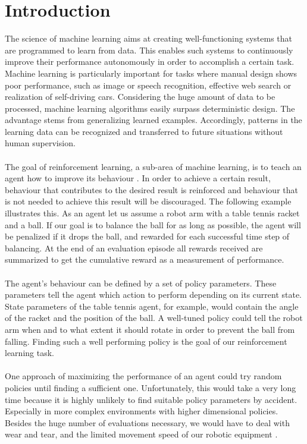 \chapter{Introduction}
\label{chap:0}

The science of machine learning aims at creating well-functioning systems that are programmed to learn from data. This enables such systems to continuously improve their performance autonomously in order to accomplish a certain task. Machine learning is particularly important for tasks where manual design shows poor performance, such as image or speech recognition, effective web search or realization of self-driving cars. Considering the huge amount of data to be processed, machine learning algorithms easily surpass deterministic design. The advantage stems from generalizing learned examples. Accordingly, patterns in the learning data can be recognized and transferred to future situations without human supervision.\\
\\
The goal of reinforcement learning, a sub-area of machine learning, is to teach an agent how to improve its behaviour \cite{sutton1998reinforcement}. In order to achieve a certain result, behaviour that contributes to the desired result is reinforced and behaviour that is not needed to achieve this result will be discouraged. The following example illustrates this. As an agent let us assume a robot arm with a table tennis racket and a ball. If our goal is to balance the ball for as long as possible, the agent will be penalized if it drops the ball, and rewarded for each successful time step of balancing. At the end of an evaluation episode all
rewards received are summarized to get the cumulative reward as a measurement of performance.\\
\\
The agent's behaviour can be defined by a set of policy parameters. These parameters tell the agent which action to perform depending on its current state. State parameters of the table tennis agent, for example, would contain the angle of the racket and the position of the ball. A well-tuned policy could tell the robot arm when and to what extent it should rotate in order to prevent the ball from falling. Finding such a well performing policy is the goal of our reinforcement learning task.\\
\\
One approach of maximizing the performance of an agent could try random policies until finding a sufficient one. Unfortunately, this would take a very long time because it is highly unlikely to find suitable policy parameters by accident. Especially in more complex environments with higher dimensional policies. Besides the huge number of evaluations necessary, we would have to deal with wear and tear, and the limited movement speed of our robotic equipment \cite{shahriari2016taking}.\\
